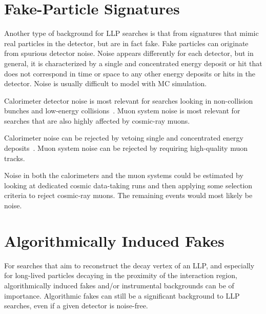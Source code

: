 \section{Fake-Particle Signatures}

Another type of background for LLP searches is that from signatures that mimic real particles in the detector, but are in fact fake. Fake particles can originate from spurious detector noise. Noise appears differently for each detector, but in general, it is characterized by a single and concentrated energy deposit or hit that does not correspond in time or space to any other energy deposits or hits in the detector. Noise is usually difficult to model with MC simulation.

Calorimeter detector noise is most relevant for searches looking in non-collision bunches and low-energy collisions~\cite{Khachatryan:2015jha, Chatrchyan:2012dxa, Khachatryan:2010uf}. Muon system noise is most relevant for searches that are also highly affected by cosmic-ray muons.

Calorimeter noise can be rejected by vetoing single and concentrated energy deposits~\cite{Khachatryan:2015jha, Chatrchyan:2012dxa, Khachatryan:2010uf}. Muon system noise can be rejected by requiring high-quality muon tracks.

Noise in both the calorimeters and the muon systems could be estimated by looking at dedicated cosmic data-taking runs and then applying some selection criteria to reject cosmic-ray muons. The remaining events would most likely be noise.

\section{Algorithmically Induced Fakes}

For searches that aim to reconstruct the decay vertex of an LLP, and especially for long-lived particles decaying in the proximity of the interaction region, algorithmically induced fakes and/or instrumental backgrounds can be of importance. Algorithmic fakes can still be a significant background to LLP searches, even if a given detector is noise-free.

